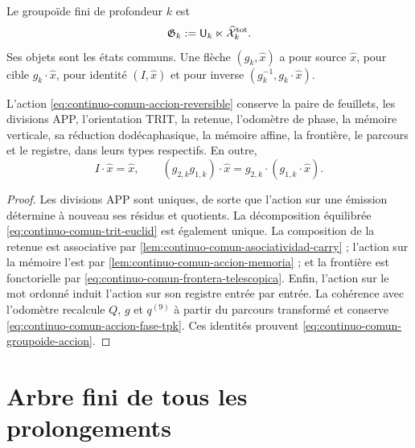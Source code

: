 \begin{definition}
\label{def:continuo-comun-groupoide}
Le groupoïde fini de profondeur \(k\) est
\begin{equation}
\label{eq:continuo-comun-groupoide}
 \mathfrak G_k
 :=\mathsf U_k\ltimes\widehat{\mathcal X}^{\rm tot}_k.
\end{equation}
Ses objets sont les états communs. Une flèche \((g_k,\widehat x)\) a pour source \(\widehat x\), pour cible \(g_k\cdot\widehat x\), pour identité \((I,\widehat x)\) et pour inverse \((g_k^{-1},g_k\cdot\widehat x)\).
\end{definition}

\begin{lemma}
\label{lem:continuo-comun-groupoide-conserva}
L'action \eqref{eq:continuo-comun-accion-reversible} conserve la paire de feuillets, les divisions APP, l'orientation TRIT, la retenue, l'odomètre de phase, la mémoire verticale, sa réduction dodécaphasique, la mémoire affine, la frontière, le parcours et le registre, dans leurs types respectifs. En outre,
\begin{equation}
\label{eq:continuo-comun-groupoide-accion}
 I\cdot\widehat x=\widehat x,
 \qquad
 (g_{2,k}g_{1,k})\cdot\widehat x
 =g_{2,k}\cdot(g_{1,k}\cdot\widehat x).
\end{equation}
\end{lemma}

\begin{proof}
Les divisions APP sont uniques, de sorte que l'action sur une émission détermine à nouveau ses résidus et quotients. La décomposition équilibrée \eqref{eq:continuo-comun-trit-euclid} est également unique. La composition de la retenue est associative par \cref{lem:continuo-comun-asociatividad-carry} ; l'action sur la mémoire l'est par \cref{lem:continuo-comun-accion-memoria} ; et la frontière est fonctorielle par \eqref{eq:continuo-comun-frontera-telescopica}. Enfin, l'action sur le mot ordonné induit l'action sur son registre entrée par entrée. La cohérence avec l'odomètre recalcule \(Q\), \(g\) et \(q^{(9)}\) à partir du parcours transformé et conserve \eqref{eq:continuo-comun-accion-fase-tpk}. Ces identités prouvent \eqref{eq:continuo-comun-groupoide-accion}.
\end{proof}

\section{Arbre fini de tous les prolongements}
\label{sec:continuo-comun-arbol}

